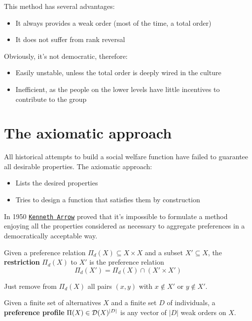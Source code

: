 This method has several advantages:
\begin{itemize}
	\item It always provides a weak order (most of the time, a total order)
	
	\item It does not suffer from rank reversal
\end{itemize}

Obviously, it's not democratic, therefore: 
\begin{itemize}
	\item Easily unstable, unless the total order is deeply wired in the culture
	
	\item Inefficient, as the people on the lower levels have little incentives to contribute to the group 
\end{itemize}


\section{The axiomatic approach}

All historical attempts to build a social welfare function have failed to guarantee all desirable properties. The axiomatic approach: 
\begin{itemize}
	\item Lists the desired properties
	
	\item Tries to design a function that satisfies them by construction
\end{itemize}

In 1950 \href{https://en.wikipedia.org/wiki/Kenneth_Arrow}{\texttt{Kenneth Arrow}} proved that it's impossible to formulate a method enjoying all the properties considered as necessary to aggregate preferences in a democratically acceptable way. 

\begin{definition}
	Given a preference relation $\Pi_d (X) \subseteq X \times X$ and a subset $X' \subseteq X$, the \textbf{restriction} $\Pi_d (X)$ to $X'$ is the preference relation
	$$ \Pi_d (X') = \Pi_d (X) \cap (X' \times X') $$
\end{definition}

Just remove from $\Pi_d (X)$ all pairs $(x,y)$ with $x \notin X'$ or $y \notin X'$. \\

\begin{definition}
	Given a finite set of alternatives $X$ and a finite set $D$ of individuals, a \textbf{preference profile} $\Pi (X) \in \operatorname{\mathcal{D}}(X)^{|D|}$ is any vector of $|D|$ weak orders on $X$.
\end{definition}

